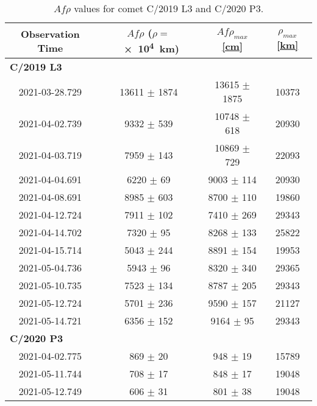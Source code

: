 \begin{table}[!htbp]
    \centering
    \caption{$Af\rho$ values for comet C/2019 L3 and C/2020 P3. }\label{tab:afrho}
    \begin{threeparttable}
        \begin{tabular}{cccc}
            \toprule
            Observation Time & $Af\rho$ ($\rho =$ \SI{e4}{\km}) & $Af\rho_{max}$ \ul{[\si{\cm}]} & $\rho_{max}$ \ul{[\si{\km}]}\\
            \midrule
            \multicolumn{4}{l}{\textbf{C/2019 L3}} \\
            2021-03-28.729 & 13611 $\pm$ 1874 & 13615 $\pm$ 1875 & 10373 \\
            2021-04-02.739 & 9332 $\pm$ 539 & 10748 $\pm$ 618 & 20930 \\
            2021-04-03.719 & 7959 $\pm$ 143 & 10869 $\pm$ 729 & 22093 \\
            2021-04-04.691 & 6220 $\pm$ 69 & 9003 $\pm$ 114 & 20930 \\
            2021-04-08.691 & 8985 $\pm$ 603 & 8700 $\pm$ 110 & 19860 \\
            2021-04-12.724 & 7911 $\pm$ 102 & 7410 $\pm$ 269 & 29343 \\
            2021-04-14.702 & 7320 $\pm$ 95 & 8268 $\pm$ 133 & 25822 \\
            2021-04-15.714 & 5043 $\pm$ 244 & 8891 $\pm$ 154 & 19953 \\
            2021-05-04.736 & 5943 $\pm$ 96 & 8320 $\pm$ 340 & 29365 \\
            2021-05-10.735 & 7523 $\pm$ 134 & 8787 $\pm$ 205 & 29343 \\
            2021-05-12.724 & 5701 $\pm$ 236 & 9590 $\pm$ 157 & 21127 \\
            2021-05-14.721 & 6356 $\pm$ 152 & 9164 $\pm$ 95 & 29343 \\
            \multicolumn{4}{l}{\textbf{C/2020 P3}} \\
            2021-04-02.775 & 869 $\pm$ 20 & 948 $\pm$ 19 & 15789 \\
            2021-05-11.744 & 708 $\pm$ 17 & 848 $\pm$ 17 & 19048 \\
            2021-05-12.749 & 606 $\pm$ 31 & 801 $\pm$ 38 & 19048 \\
            \bottomrule
        \end{tabular}
    \end{threeparttable}
\end{table}


